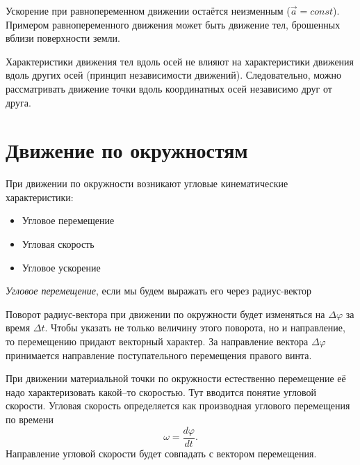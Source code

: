 \documentclass[10pt]{extbook}
\begin{document}
Ускорение при равнопеременном движении остаётся неизменным  (\( \vec{a} = const \)). Примером равнопеременного движения может быть движение тел, брошенных вблизи поверхности земли.

Характеристики движения тел вдоль осей не влияют на характеристики движения
вдоль других осей (принцип независимости движений). Следовательно, можно
рассматривать движение точки вдоль координатных осей независимо друг от друга.

\section{Движение по окружностям}

При движении по окружности возникают угловые кинематические характеристики:
\begin{itemize}
	\item Угловое перемещение
	\item Угловая скорость
	\item Угловое ускорение
\end{itemize}

\emph{Угловое перемещение}, если мы будем выражать его через радиус-вектор


Поворот радиус-вектора при движении по окружности будет изменяться на \( \Delta
\varphi \) за время \( \Delta t \). Чтобы указать не только величину этого
поворота, но и направление, то перемещению придают векторный характер. За
направление вектора \( \Delta \varphi \) принимается направление
поступательного перемещения правого винта.

При движении материальной точки по окружности естественно перемещение её надо
характеризовать какой--то скоростью. Тут вводится понятие угловой скорости.
Угловая скорость определяется как производная углового перемещения по времени
\[ \omega = \frac{d \varphi}{d t} .\] Направление угловой скорости будет
совпадать с вектором перемещения.
\end{document}
